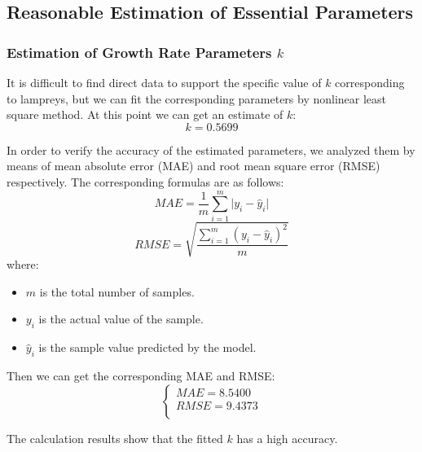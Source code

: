 \documentclass[12pt]{article}  %
\begin{document}
\subsection{Reasonable Estimation of Essential Parameters}
\subsubsection{Estimation of Growth Rate Parameters $k$}
It is difficult to find direct data to support the specific value of  $k$ corresponding to lampreys, but we can fit the corresponding parameters by nonlinear least square method. At this point we can get an estimate of $k$:
\begin{equation}
	k=0.5699
\end{equation}

In order to verify the accuracy of the estimated parameters, we analyzed them by means of mean absolute error (MAE) and root mean square error (RMSE) respectively. The corresponding formulas are as follows:
\begin{equation}
	MAE=\frac{1}{m}\sum_{i=1}^m{|y_i-\hat{y}_i}|
\end{equation}
\begin{equation}
RMSE=\sqrt{\frac{\sum_{i=1}^m{\left( y_i-\hat{y}_i \right) ^2}}{m}}
\end{equation}
where:
\begin{itemize}
	\setlength{\parsep}{0ex} %
	\setlength{\topsep}{2ex} %
	\setlength{\itemsep}{1ex} %
	\item $m$ is the total number of samples.
	\item $y_{i}$ is the actual value of the sample.
	\item $\hat{y}_i$ is the sample value predicted by the model.
\end{itemize}

Then we can get the corresponding MAE and RMSE:
\begin{equation}
	\begin{cases}
		MAE=8.5400\\
		RMSE=9.4373\\
	\end{cases}
\end{equation}

The calculation results show that the fitted $k$ has a high accuracy.
\end{document}
